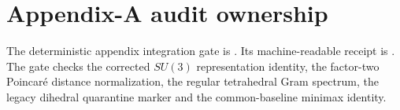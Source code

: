 \section{Appendix-A audit ownership}

The deterministic appendix integration gate is
.
Its machine-readable receipt is
.
The gate checks the corrected \(SU(3)\) representation identity, the factor-two
Poincar\'e distance normalization, the regular tetrahedral Gram spectrum, the
legacy dihedral quarantine marker and the common-baseline minimax identity.
